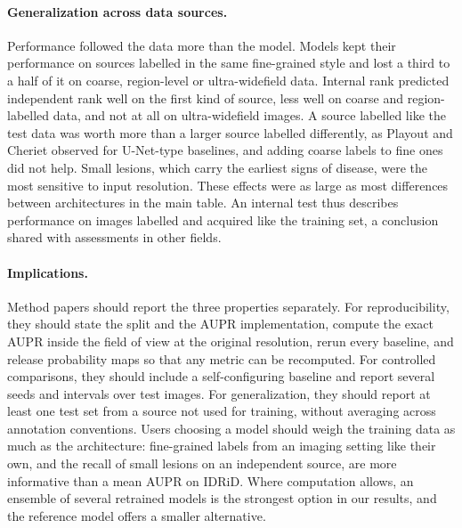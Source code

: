 \paragraph{Generalization across data sources.} Performance followed the data more than the model. Models kept their performance on sources labelled in the same fine-grained style and lost a third to a half of it on coarse, region-level or ultra-widefield data. Internal rank predicted independent rank well on the first kind of source, less well on coarse and region-labelled data, and not at all on ultra-widefield images. A source labelled like the test data was worth more than a larger source labelled differently, as Playout and Cheriet observed for U-Net-type baselines\cite{playout2024crossdatasetgeneralization}, and adding coarse labels to fine ones did not help. Small lesions, which carry the earliest signs of disease, were the most sensitive to input resolution. These effects were as large as most differences between architectures in the main table. An internal test thus describes performance on images labelled and acquired like the training set, a conclusion shared with assessments in other fields\cite{lu2026tcrepitopenaturemethods}.

\paragraph{Implications.} Method papers should report the three properties separately. For reproducibility, they should state the split and the AUPR implementation, compute the exact AUPR inside the field of view at the original resolution, rerun every baseline, and release probability maps so that any metric can be recomputed. For controlled comparisons, they should include a self-configuring baseline and report several seeds and intervals over test images. For generalization, they should report at least one test set from a source not used for training, without averaging across annotation conventions. Users choosing a model should weigh the training data as much as the architecture: fine-grained labels from an imaging setting like their own, and the recall of small lesions on an independent source, are more informative than a mean AUPR on IDRiD. Where computation allows, an ensemble of several retrained models is the strongest option in our results, and the reference model offers a smaller alternative.


